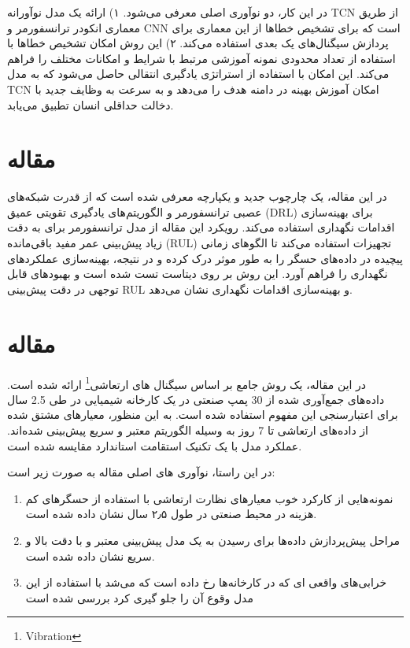 \documentclass[a4paper,10pt]{article}
\begin{document}
در این کار، دو نوآوری اصلی معرفی می‌شود. ۱) ارائه یک مدل نوآورانه TCN از طریق معماری انکودر ترانسفورمر و CNN است که برای تشخیص خطاها از این معماری برای پردازش سیگنال‌های یک بعدی استفاده می‌کند. ۲) این روش امکان تشخیص خطاها با استفاده از تعداد محدودی نمونه آموزشی مرتبط با شرایط و امکانات مختلف را فراهم می‌کند. این امکان با استفاده از استراتژی یادگیری انتقالی حاصل می‌شود که به مدل TCN امکان آموزش بهینه در دامنه هدف را می‌دهد و به سرعت به وظایف جدید با دخالت حداقلی انسان تطبیق می‌یابد.


\section{مقاله \textcolor{blue}{\cite{article11}}}
در این مقاله، یک چارچوب جدید و یکپارچه معرفی شده است که از قدرت شبکه‌های عصبی ترانسفورمر و الگوریتم‌های یادگیری تقویتی عمیق (DRL) برای بهینه‌سازی اقدامات نگهداری استفاده می‌کند. رویکرد این مقاله از مدل ترانسفورمر برای به دقت زیاد پیش‌بینی عمر مفید باقی‌مانده (RUL) تجهیزات استفاده می‌کند تا الگوهای زمانی پیچیده در داده‌های حسگر را به طور موثر درک کرده و در نتیجه، بهینه‌سازی عملکردهای نگهداری را فراهم آورد. این روش بر روی دیتاست  تست شده است و بهبودهای قابل توجهی در دقت پیش‌بینی RUL و بهینه‌سازی اقدامات نگهداری نشان می‌دهد.


\section{مقاله \textcolor{blue}{\cite{article1}}}
در این مقاله، یک روش جامع بر اساس سیگنال های ارتعاشی\footnote{Vibration} ارائه شده است. داده‌های جمع‌آوری شده از 30 پمپ صنعتی در یک کارخانه شیمیایی در طی 2.5 سال برای اعتبارسنجی این مفهوم استفاده شده است. به این منظور، معیارهای مشتق شده از داده‌های ارتعاشی تا 7 روز به وسیله الگوریتم معتبر و سریع  پیش‌بینی شده‌اند. عملکرد مدل با یک تکنیک استقامت استاندارد مقایسه شده است.


در این راستا، نو‌آوری های اصلی مقاله به‌ صورت زیر است:
\begin{enumerate}
	\item نمونه‌هایی از کارکرد خوب معیارهای نظارت ارتعاشی با استفاده از حسگرهای کم هزینه در محیط صنعتی در طول ۲٫۵ سال نشان داده شده است.
	\item مراحل پیش‌پردازش داده‌ها برای رسیدن به یک مدل پیش‌بینی معتبر و با دقت بالا و سریع نشان داده شده است.
	\item خرابی‌های واقعی ای که در کارخانه‌ها رخ داده است که می‌شد با استفاده از این مدل وقوع آن را جلو گیری کرد بررسی شده است
\end{enumerate}
\end{document}
